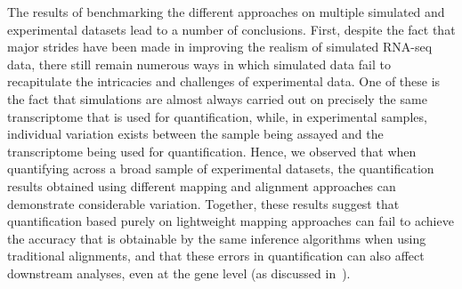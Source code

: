 The results of benchmarking the different approaches on multiple simulated and
experimental datasets lead to a number of conclusions. First, despite the fact
that major strides have been made in improving the realism of simulated RNA-seq
data, there still remain numerous ways in which simulated data fail to
recapitulate the intricacies and challenges of experimental data. One of these
is the fact that simulations are almost always carried out on precisely the same
transcriptome that is used for quantification, while, in experimental samples,
individual variation exists between the sample being assayed and the
transcriptome being used for quantification.  Hence, we observed that when quantifying across a broad sample
of experimental datasets, the quantification results obtained using different
mapping and alignment approaches can demonstrate considerable variation.
Together, these results suggest that quantification based purely on lightweight
mapping approaches can fail to achieve the accuracy that is obtainable by the
same inference algorithms when using traditional alignments, and that these
errors in quantification can also affect downstream analyses, even at the gene
level (as discussed in~). 

